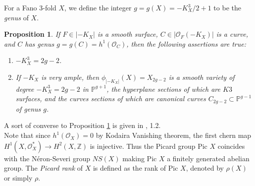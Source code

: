 \documentclass[11pt]{amsart}
\theoremstyle{plain}
\newtheorem{proposition}[theorem]{Proposition}
\theoremstyle{definition}
\theoremstyle{expl}
\begin{document}
\noindent For a Fano $3$-fold $X$, we define the integer $g=g(X)= -K_X^3/2+1 $ to be the \textit{genus} of $X$.
\begin{proposition}
\label{A}
    If $F \in |-K_X|$ is a smooth surface, $C \in |\mathcal{O}_F(-K_X)|$ is a curve, and $C$ has genus $g=g(C) = h^1(\mathcal{O}_C)$, then the following assertions are true:
    \begin{enumerate}
        \item[(i)] $-K_{X}^3 = 2g-2 $.
        \item[(ii)] If $-K_X$ is very ample, then $\phi_{|-K_X|}(X)= X_{2g-2}$ is a smooth variety of degree $-K_{X}^3 = 2g-2$ in $\mathbb{P}^{g+1}$, the hyperplane sections of which are $K3$ surfaces, and the curves sections of which are canonical curves $C_{2g-2} \subset \mathbb{P}^{g-1}$ of genus $g$.
    \end{enumerate}
\end{proposition}

\noindent A sort of converse to Proposition \ref{A} is given in \cite{Isk78}, 1.2.\\
\noindent Note that since $h^1(\mathcal{O}_X)=0$ by Kodaira Vanishing theorem, the first chern map $H^1(X,\mathcal{O}_X^*) \to H^2(X,\mathbb{Z})$ is injective. Thus the Picard group Pic $X$ coincides with the N\'{e}ron-Severi group $NS(X)$ making Pic $X$ a finitely generated abelian group. The \textit{Picard rank} of $X$ is defined as the rank of Pic $X$, denoted by $\rho(X)$ or simply $\rho$.
\end{document}
